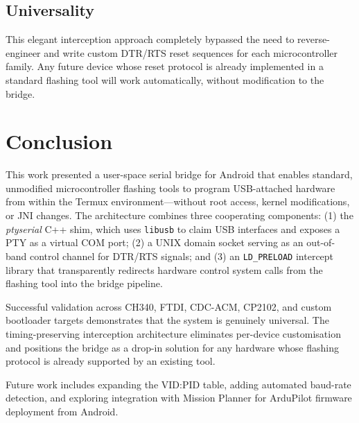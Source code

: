 \documentclass[conference]{IEEEtran}
\begin{document}
\subsection{Universality}

This elegant interception approach completely bypassed the need to reverse-engineer and write custom DTR/RTS reset sequences for each microcontroller family. Any future device whose reset protocol is already implemented in a standard flashing tool will work automatically, without modification to the bridge.

\section{Conclusion}
\label{sec:conclusion}

This work presented a user-space serial bridge for Android that enables standard, unmodified microcontroller flashing tools to program USB-attached hardware from within the Termux environment—without root access, kernel modifications, or JNI changes. The architecture combines three cooperating components: (1) the \textit{ptyserial} C++ shim, which uses \texttt{libusb} to claim USB interfaces and exposes a PTY as a virtual COM port; (2) a UNIX domain socket serving as an out-of-band control channel for DTR/RTS signals; and (3) an \texttt{LD\_PRELOAD} intercept library that transparently redirects hardware control system calls from the flashing tool into the bridge pipeline.

Successful validation across CH340, FTDI, CDC-ACM, CP2102, and custom bootloader targets demonstrates that the system is genuinely universal. The timing-preserving interception architecture eliminates per-device customisation and positions the bridge as a drop-in solution for any hardware whose flashing protocol is already supported by an existing tool.

Future work includes expanding the VID:PID table, adding automated baud-rate detection, and exploring integration with Mission Planner for ArduPilot firmware deployment from Android.



\end{document}
